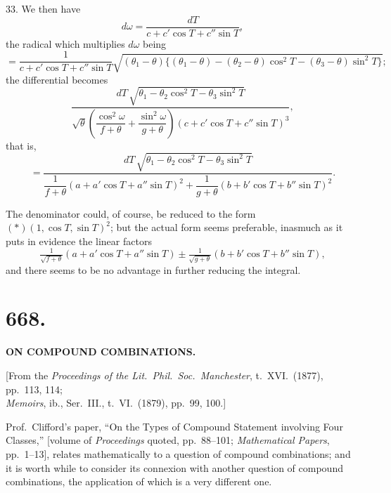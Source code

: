 \documentclass[11pt,a4paper]{article}
\begin{document}
\medskip

33. We then have
\[
d\omega = \frac{dT}{c + c'\cos T + c''\sin T},
\]
the radical which multiplies $d\omega$ being
\[
= \frac{1}{c + c'\cos T + c''\sin T}\sqrt{(\theta_{1} - \theta)\{(\theta_{1} - \theta) - (\theta_{2} - \theta)\cos^{2}T - (\theta_{3} - \theta)\sin^{2}T\}};
\]
the differential becomes
\[
\frac{dT\,\sqrt{\theta_{1} - \theta_{2}\cos^{2}T - \theta_{3}\sin^{2}T}}{\sqrt{\theta}\left(\dfrac{\cos^{2}\omega}{f + \theta} + \dfrac{\sin^{2}\omega}{g + \theta}\right)(c + c'\cos T + c''\sin T)^{3}},
\]
that is,
\[
= \frac{dT\,\sqrt{\theta_{1} - \theta_{2}\cos^{2}T - \theta_{3}\sin^{2}T}}{\dfrac{1}{f + \theta}(a + a'\cos T + a''\sin T)^{2} + \dfrac{1}{g + \theta}(b + b'\cos T + b''\sin T)^{2}}.
\]

\medskip

The denominator could, of course, be reduced to the form $(\ast)(1, \cos T, \sin T)^{2}$; but the actual form seems preferable, inasmuch as it puts in evidence the linear factors
\[
\tfrac{1}{\sqrt{f + \theta}}(a + a'\cos T + a''\sin T) \pm \tfrac{1}{\sqrt{g + \theta}}(b + b'\cos T + b''\sin T),
\]
and there seems to be no advantage in further reducing the integral.

\newpage



\section*{668.}

\begin{center}
\textbf{ON COMPOUND COMBINATIONS.}
\end{center}

\medskip

\begin{center}
[From the \emph{Proceedings of the Lit.~Phil.~Soc.~Manchester}, t.~XVI.\ (1877), pp.~113, 114;\\
\emph{Memoirs}, ib., Ser.~III., t.~VI.\ (1879), pp.~99, 100.]
\end{center}

\medskip

\noindent Prof.\ Clifford's paper, ``On the Types of Compound Statement involving Four Classes,'' [volume of \emph{Proceedings} quoted, pp.~88--101; \emph{Mathematical Papers}, pp.~1--13], relates mathematically to a question of compound combinations; and it is worth while to consider its connexion with another question of compound combinations, the application of which is a very different one.
\end{document}
